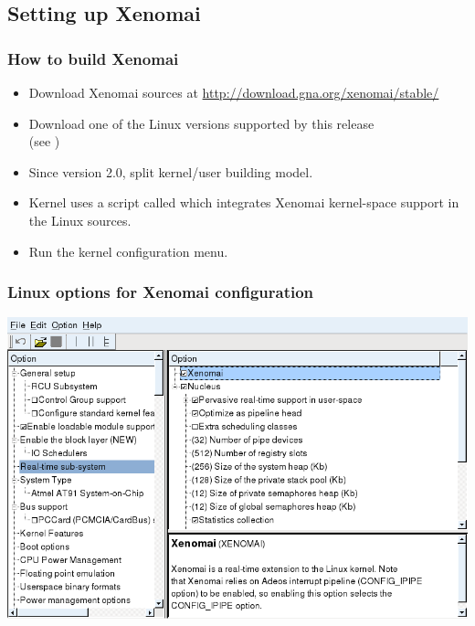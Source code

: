 \subsection{Setting up Xenomai}

\begin{frame}
  \frametitle{How to build Xenomai}
  \begin{itemize}
  \item Download Xenomai sources at \url{http://download.gna.org/xenomai/stable/}
  \item Download one of the Linux versions supported by this release\\
    (see )
  \item Since version 2.0, split kernel/user building model.
  \item Kernel uses a script called 
    which integrates Xenomai kernel-space support in the Linux
    sources.
  \item Run the kernel configuration menu.
  \end{itemize}
\end{frame}

\begin{frame}
  \frametitle{Linux options for Xenomai configuration}
  \begin{center}
    \includegraphics[width=\textwidth]{slides/sysdev-realtime/xenomai-kernel-config.png}
  \end{center}
\end{frame}

